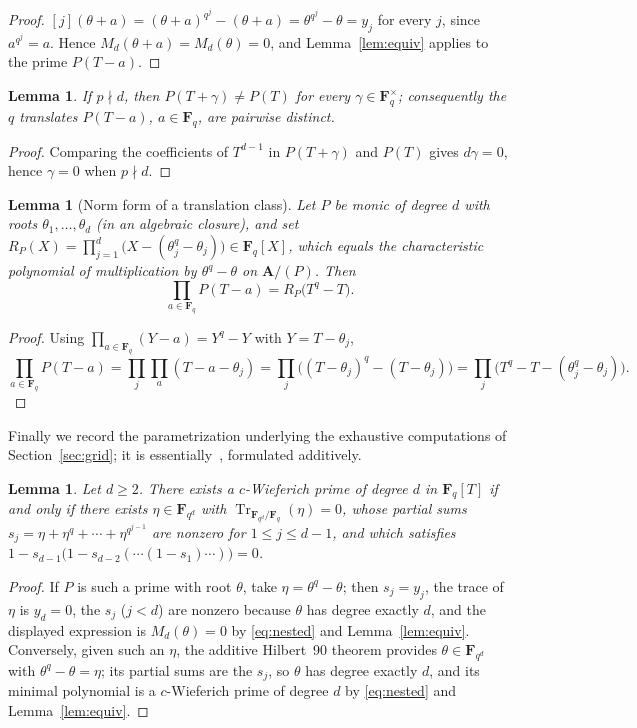 \documentclass[10pt,a4paper]{amsart}
\newcommand{\A}{\mathbf{A}}
\newcommand{\F}{\mathbf{F}}
\newcommand{\Tr}{\operatorname{Tr}}
\newtheorem{lemma}[theorem]{Lemma}
\begin{document}
\begin{proof}
$[j](\theta+a)=(\theta+a)^{q^j}-(\theta+a)=\theta^{q^j}-\theta=y_j$ for every
$j$, since $a^{q^j}=a$. Hence $M_d(\theta+a)=M_d(\theta)=0$, and
Lemma~\ref{lem:equiv} applies to the prime $P(T-a)$.
\end{proof}

\begin{lemma}\label{lem:nonfixed}
If $p\nmid d$, then $P(T+\gamma)\neq P(T)$ for every $\gamma\in\F_q^\times$;
consequently the $q$ translates $P(T-a)$, $a\in\F_q$, are pairwise distinct.
\end{lemma}

\begin{proof}
Comparing the coefficients of $T^{d-1}$ in $P(T+\gamma)$ and $P(T)$ gives
$d\gamma=0$, hence $\gamma=0$ when $p\nmid d$.
\end{proof}

\begin{lemma}[Norm form of a translation class]\label{lem:norm}
Let $P$ be monic of degree $d$ with roots $\theta_1,\dots,\theta_d$ (in an
algebraic closure), and set
$R_P(X)=\prod_{j=1}^d\bigl(X-(\theta_j^q-\theta_j)\bigr)\in\F_q[X]$, which equals
the characteristic polynomial of multiplication by $\theta^q-\theta$ on
$\A/(P)$. Then
\[
\prod_{a\in\F_q}P(T-a)=R_P\bigl(T^q-T\bigr).
\]
\end{lemma}

\begin{proof}
Using $\prod_{a\in\F_q}(Y-a)=Y^q-Y$ with $Y=T-\theta_j$,
\[
\prod_{a\in\F_q}P(T-a)=\prod_j\prod_a(T-a-\theta_j)
=\prod_j\bigl((T-\theta_j)^q-(T-\theta_j)\bigr)
=\prod_j\bigl(T^q-T-(\theta_j^q-\theta_j)\bigr).
\]
\end{proof}

Finally we record the parametrization underlying the exhaustive computations of
Section~\ref{sec:grid}; it is essentially~\cite[Thms.~3.3--3.4]{BB}, formulated
additively.

\begin{lemma}\label{lem:H90}
Let $d\ge2$. There exists a $c$-Wieferich prime of degree $d$ in $\F_q[T]$ if
and only if there exists $\eta\in\F_{q^d}$ with
$\Tr_{\F_{q^d}/\F_q}(\eta)=0$, whose partial sums
$s_j=\eta+\eta^q+\cdots+\eta^{q^{j-1}}$ are nonzero for $1\le j\le d-1$, and
which satisfies $1-s_{d-1}\bigl(1-s_{d-2}(\cdots(1-s_1)\cdots)\bigr)=0$.
\end{lemma}

\begin{proof}
If $P$ is such a prime with root $\theta$, take $\eta=\theta^q-\theta$; then
$s_j=y_j$, the trace of $\eta$ is $y_d=0$, the $s_j$ ($j<d$) are nonzero because
$\theta$ has degree exactly $d$, and the displayed expression is $M_d(\theta)=0$
by \eqref{eq:nested} and Lemma~\ref{lem:equiv}. Conversely, given such an
$\eta$, the additive Hilbert~90 theorem provides $\theta\in\F_{q^d}$ with
$\theta^q-\theta=\eta$; its partial sums are the $s_j$, so $\theta$ has degree
exactly $d$, and its minimal polynomial is a $c$-Wieferich prime of degree $d$
by \eqref{eq:nested} and Lemma~\ref{lem:equiv}.
\end{proof}
\end{document}

